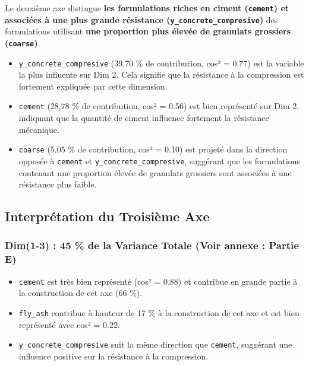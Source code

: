 \documentclass[
  12pt,
]{article}
\providecommand{\tightlist}{%
  \setlength{\itemsep}{0pt}\setlength{\parskip}{0pt}}
\begin{document}
Le deuxième axe distingue \textbf{les formulations riches en ciment
(\texttt{cement}) et associées à une plus grande résistance
(\texttt{y\_concrete\_compresive})} des formulations utilisant
\textbf{une proportion plus élevée de granulats grossiers
(\texttt{coarse})}.

\begin{itemize}
\tightlist
\item
  \texttt{y\_concrete\_compresive} (39,70 \% de contribution, cos² =
  0.77) est la variable la plus influente sur Dim 2. Cela signifie que
  la résistance à la compression est fortement expliquée par cette
  dimension.
\item
  \texttt{cement} (28,78 \% de contribution, cos² = 0.56) est bien
  représenté sur Dim 2, indiquant que la quantité de ciment influence
  fortement la résistance mécanique.
\item
  \texttt{coarse} (5,05 \% de contribution, cos² = 0.10) est projeté
  dans la direction opposée à \texttt{cement} et
  \texttt{y\_concrete\_compresive}, suggérant que les formulations
  contenant une proportion élevée de granulats grossiers sont associées
  à une résistance plus faible.
\end{itemize}

\subsection{Interprétation du Troisième
Axe}\label{interpruxe9tation-du-troisiuxe8me-axe}

\subsubsection{Dim(1-3) : 45 \% de la Variance Totale (Voir annexe :
Partie E)}\label{dim1-3-45-de-la-variance-totale-voir-annexe-partie-e}

\begin{itemize}
\tightlist
\item
  \texttt{cement} est très bien représenté (cos² = 0.88) et contribue en
  grande partie à la construction de cet axe (66 \%).
\item
  \texttt{fly\_ash} contribue à hauteur de 17 \% à la construction de
  cet axe et est bien représenté avec cos² = 0.22.
\item
  \texttt{y\_concrete\_compresive} suit la même direction que
  \texttt{cement}, suggérant une influence positive sur la résistance à
  la compression.
\end{itemize}
\end{document}

